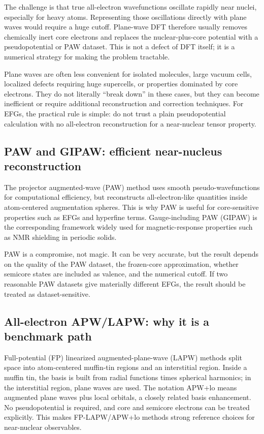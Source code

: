 \documentclass[11pt]{article}
\begin{document}
The challenge is that true all-electron wavefunctions oscillate rapidly near nuclei, especially for heavy atoms.  Representing those oscillations directly with plane waves would require a huge cutoff.  Plane-wave DFT therefore usually removes chemically inert core electrons and replaces the nuclear-plus-core potential with a pseudopotential or PAW dataset.  This is not a defect of DFT itself; it is a numerical strategy for making the problem tractable.

Plane waves are often less convenient for isolated molecules, large vacuum cells, localized defects requiring huge supercells, or properties dominated by core electrons.  They do not literally ``break down'' in these cases, but they can become inefficient or require additional reconstruction and correction techniques.  For EFGs, the practical rule is simple: do not trust a plain pseudopotential calculation with no all-electron reconstruction for a near-nuclear tensor property.

\subsection{PAW and GIPAW: efficient near-nucleus reconstruction}

The projector augmented-wave (PAW) method uses smooth pseudo-wavefunctions for computational efficiency, but reconstructs all-electron-like quantities inside atom-centered augmentation spheres.  This is why PAW is useful for core-sensitive properties such as EFGs and hyperfine terms.  Gauge-including PAW (GIPAW) is the corresponding framework widely used for magnetic-response properties such as NMR shielding in periodic solids.

PAW is a compromise, not magic.  It can be very accurate, but the result depends on the quality of the PAW dataset, the frozen-core approximation, whether semicore states are included as valence, and the numerical cutoff.  If two reasonable PAW datasets give materially different EFGs, the result should be treated as dataset-sensitive.

\subsection{All-electron APW/LAPW: why it is a benchmark path}

Full-potential (FP) linearized augmented-plane-wave (LAPW) methods split space into atom-centered muffin-tin regions and an interstitial region.  Inside a muffin tin, the basis is built from radial functions times spherical harmonics; in the interstitial region, plane waves are used.  The notation APW+lo means augmented plane waves plus local orbitals, a closely related basis enhancement.  No pseudopotential is required, and core and semicore electrons can be treated explicitly.  This makes FP-LAPW/APW+lo methods strong reference choices for near-nuclear observables.
\end{document}
